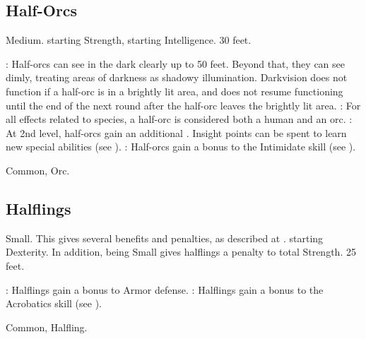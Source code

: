\subsection{Half-Orcs}
 Medium.
  starting Strength,  starting Intelligence.
 30 feet.
\begin{itemize}
    : Half-orcs can see in the dark clearly up to 50 feet. Beyond that, they can see dimly, treating areas of darkness as shadowy illumination. Darkvision does not function if a half-orc is in a brightly lit area, and does not resume functioning until the end of the next round after the half-orc leaves the brightly lit area.
    : For all effects related to species, a half-orc is considered both a human and an orc.
    : At 2nd level, half-orcs gain an additional .
        Insight points can be spent to learn new special abilities (see ).
    : Half-orcs gain a  bonus to the Intimidate skill (see ).
\end{itemize}
 Common, Orc.

\subsection{Halflings}
 Small. This gives several benefits and penalties, as described at .
  starting Dexterity. In addition, being Small gives halflings a  penalty to total Strength.
 25 feet.
\begin{itemize}
    : Halflings gain a  bonus to Armor defense.
    : Halflings gain a  bonus to the Acrobatics skill (see ).
\end{itemize}
 Common, Halfling.
